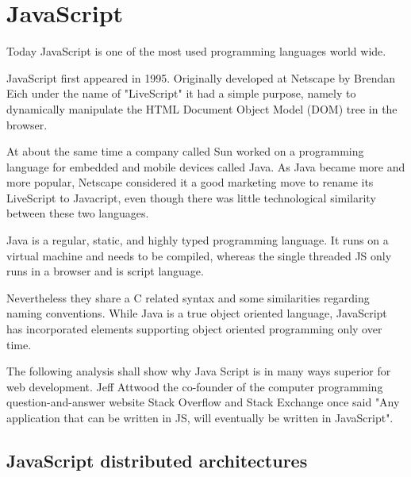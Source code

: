 \section{JavaScript}
Today JavaScript is one of the most used programming languages world wide.


JavaScript first appeared in 1995. Originally developed at Netscape
 by Brendan Eich under the name of "LiveScript" it had a simple purpose, namely to dynamically manipulate the HTML Document Object Model (DOM) tree in the browser.
 
At about the same time a company called Sun worked on a programming
 language for embedded and mobile devices called Java.   
 As Java became more and more popular,
  Netscape considered it a good marketing move to rename its
  LiveScript to Javacript, even though there was little technological
  similarity between these two languages.
    

Java is a regular, static, and highly typed programming language.
 It runs on a virtual machine and needs to be compiled, whereas the
  single threaded \gls{JS} only runs in a browser and is script
  language. 
  
  Nevertheless they share a C related syntax and some 
  similarities regarding naming conventions. While Java is a true
  object oriented language, JavaScript has incorporated elements
  supporting object oriented programming only over time. \cite{Bewersdorff2018ObjektorientierteProgrammierung}
  
The following analysis shall show why Java Script is in many ways superior for web development. Jeff Attwood the co-founder of the  computer programming question-and-answer website Stack Overflow and Stack Exchange once said "Any application that can be written in \gls{JS}, will eventually be written in JavaScript". \cite{HistoryJS1} \cite{HistoryJS2} \cite{HistoryJS3} \cite{Louis2018Java}

\subsection{JavaScript distributed architectures}


